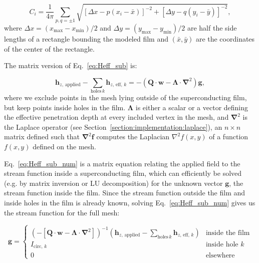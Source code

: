 \documentclass{article}
\begin{document}
\begin{equation}
    \label{eq:C_vector}
    C_i = \frac{1}{4\pi}\sum_{p,q=\pm1}\sqrt{[\Delta x - p(x_i-\bar{x})]^{-2} + [\Delta y - q(y_i-\bar{y})]^{-2}},
\end{equation}
where $\Delta x=(x_\mathrm{max}-x_\mathrm{min})/2$ and $\Delta y=(y_\mathrm{max}-y_\mathrm{min})/2$ are half the side lengths of a rectangle bounding the modeled film and $(\bar{x}, \bar{y})$ are the coordinates of the center of the rectangle.

The matrix version of Eq.~\ref{eq:Heff_sub} is:

\begin{equation}
    \label{eq:Heff_sub_num}
     \mathbf{h}_{z,\,\mathrm{applied}} - \sum_{\mathrm{holes}\, k}\mathbf{h}_{z,\,\mathrm{eff},\,k} = -(\mathbf{Q}\cdot\mathbf{w}-\mathbf{\Lambda}\cdot\mathbf{\nabla}^2)\mathbf{g},
\end{equation}
where we exclude points in the mesh lying outside of the superconducting film, but keep points
inside holes in the film. $\mathbf{\Lambda}$ is either a scalar or a vector defining the effective penetration depth at every included vertex in the mesh, and $\mathbf{\nabla}^2$
is the Laplace operator (see Section~\ref{section:implementation:laplace}), an $n\times n$ matrix defined such that $\mathbf{\nabla}^2\mathbf{f}$ computes the Laplacian $\nabla^2f(x,y)$ of a function $f(x,y)$ defined on the mesh.

Eq.~\ref{eq:Heff_sub_num} is a matrix equation relating the applied field to the stream function
inside a superconducting film, which can efficiently be solved (e.g. by matrix inversion or LU decomposition) for the unknown vector $\mathbf{g}$, the stream function inside the film. Since the stream function outside the film and inside holes in the film is already known, solving Eq.~\ref{eq:Heff_sub_num} gives us the stream function for the full mesh:

\begin{equation}
    \label{eq:full_stream}
    \mathbf{g} = \begin{cases}
        \left(-[\mathbf{Q}\cdot\mathbf{w}-\mathbf{\Lambda}\cdot\mathbf{\nabla}^2]\right)^{-1}
        \left(\mathbf{h}_{z,\,\mathrm{applied}} - \sum_{\mathrm{holes}\,k}\mathbf{h}_{z,\,\mathrm{eff},\,k}\right)
            & \text{inside the film}\\
        I_{\mathrm{circ},\,k}
            & \text{inside hole }k\\
        0
            & \text{elsewhere}
    \end{cases}
\end{equation}
\end{document}
